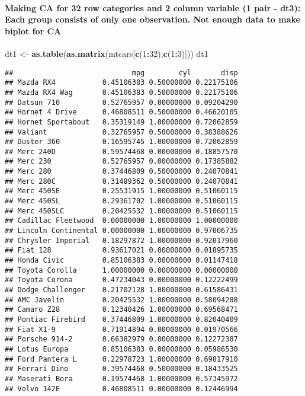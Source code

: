\documentclass[]{article}
\newenvironment{Shaded}{\begin{snugshade}}{\end{snugshade}}
\newcommand{\KeywordTok}[1]{\textcolor[rgb]{0.13,0.29,0.53}{\textbf{#1}}}
\newcommand{\DecValTok}[1]{\textcolor[rgb]{0.00,0.00,0.81}{#1}}
\newcommand{\StringTok}[1]{\textcolor[rgb]{0.31,0.60,0.02}{#1}}
\newcommand{\OperatorTok}[1]{\textcolor[rgb]{0.81,0.36,0.00}{\textbf{#1}}}
\newcommand{\NormalTok}[1]{#1}
\let\oldparagraph\paragraph
\renewcommand{\paragraph}[1]{\oldparagraph{#1}\mbox{}}
\begin{document}
\paragraph{Making CA for 32 row categories and 2 column variable (1 pair
- dt3): Each group consists of only one observation. Not enough data to
make biplot for
CA}\label{making-ca-for-32-row-categories-and-2-column-variable-1-pair---dt3-each-group-consists-of-only-one-observation.-not-enough-data-to-make-biplot-for-ca}

\begin{Shaded}
\begin{Highlighting}[]
\NormalTok{dt1 <-}\StringTok{ }\KeywordTok{as.table}\NormalTok{(}\KeywordTok{as.matrix}\NormalTok{(mtcars[}\KeywordTok{c}\NormalTok{(}\DecValTok{1}\OperatorTok{:}\DecValTok{32}\NormalTok{),}\KeywordTok{c}\NormalTok{(}\DecValTok{1}\OperatorTok{:}\DecValTok{3}\NormalTok{)])) }
\NormalTok{dt1}
\end{Highlighting}
\end{Shaded}

\begin{verbatim}
##                            mpg        cyl       disp
## Mazda RX4           0.45106383 0.50000000 0.22175106
## Mazda RX4 Wag       0.45106383 0.50000000 0.22175106
## Datsun 710          0.52765957 0.00000000 0.09204290
## Hornet 4 Drive      0.46808511 0.50000000 0.46620105
## Hornet Sportabout   0.35319149 1.00000000 0.72062859
## Valiant             0.32765957 0.50000000 0.38388626
## Duster 360          0.16595745 1.00000000 0.72062859
## Merc 240D           0.59574468 0.00000000 0.18857570
## Merc 230            0.52765957 0.00000000 0.17385882
## Merc 280            0.37446809 0.50000000 0.24070841
## Merc 280C           0.31489362 0.50000000 0.24070841
## Merc 450SE          0.25531915 1.00000000 0.51060115
## Merc 450SL          0.29361702 1.00000000 0.51060115
## Merc 450SLC         0.20425532 1.00000000 0.51060115
## Cadillac Fleetwood  0.00000000 1.00000000 1.00000000
## Lincoln Continental 0.00000000 1.00000000 0.97006735
## Chrysler Imperial   0.18297872 1.00000000 0.92017960
## Fiat 128            0.93617021 0.00000000 0.01895735
## Honda Civic         0.85106383 0.00000000 0.01147418
## Toyota Corolla      1.00000000 0.00000000 0.00000000
## Toyota Corona       0.47234043 0.00000000 0.12222499
## Dodge Challenger    0.21702128 1.00000000 0.61586431
## AMC Javelin         0.20425532 1.00000000 0.58094288
## Camaro Z28          0.12340426 1.00000000 0.69568471
## Pontiac Firebird    0.37446809 1.00000000 0.82040409
## Fiat X1-9           0.71914894 0.00000000 0.01970566
## Porsche 914-2       0.66382979 0.00000000 0.12272387
## Lotus Europa        0.85106383 0.00000000 0.05986530
## Ford Pantera L      0.22978723 1.00000000 0.69817910
## Ferrari Dino        0.39574468 0.50000000 0.18433525
## Maserati Bora       0.19574468 1.00000000 0.57345972
## Volvo 142E          0.46808511 0.00000000 0.12446994
\end{verbatim}
\end{document}
